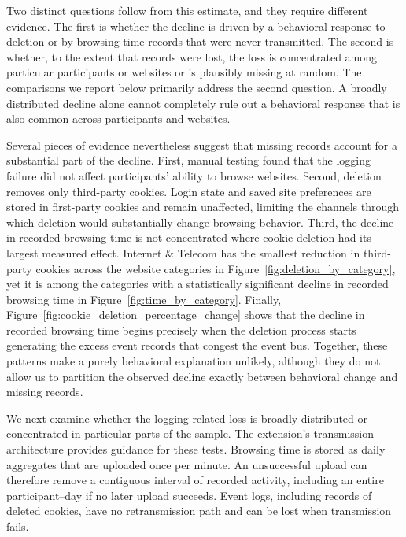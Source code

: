 \documentclass[12pt]{article}
\theoremstyle{definition}
\theoremstyle{remark}
\begin{document}
\begin{appendix}
Two distinct questions follow from this estimate, and they require different evidence. The first is whether the decline is driven by a behavioral response to deletion or by browsing-time records that were never transmitted. The second is whether, to the extent that records were lost, the loss is concentrated among particular participants or websites or is plausibly missing at random. The comparisons we report below primarily address the second question. A broadly distributed decline alone cannot completely rule out a behavioral response that is also common across participants and websites.

Several pieces of evidence nevertheless suggest that missing records account for a substantial part of the decline. First, manual testing found that the logging failure did not affect participants' ability to browse websites. Second, deletion removes only third-party cookies. Login state and saved site preferences are stored in first-party cookies and remain unaffected, limiting the channels through which deletion would substantially change browsing behavior. Third, the decline in recorded browsing time is not concentrated where cookie deletion had its largest measured effect. Internet \& Telecom has the smallest reduction in third-party cookies across the website categories in Figure~\ref{fig:deletion_by_category}, yet it is among the categories with a statistically significant decline in recorded browsing time in Figure~\ref{fig:time_by_category}. Finally, Figure~\ref{fig:cookie_deletion_percentage_change} shows that the decline in recorded browsing time begins precisely when the deletion process starts generating the excess event records that congest the event bus. Together, these patterns make a purely behavioral explanation unlikely, although they do not allow us to partition the observed decline exactly between behavioral change and missing records.

We next examine whether the logging-related loss is broadly distributed or concentrated in particular parts of the sample. The extension's transmission architecture provides guidance for these tests. Browsing time is stored as daily aggregates that are uploaded once per minute. An unsuccessful upload can therefore remove a contiguous interval of recorded activity, including an entire participant--day if no later upload succeeds. Event logs, including records of deleted cookies, have no retransmission path and can be lost when transmission fails.


\end{appendix}
\end{document}
